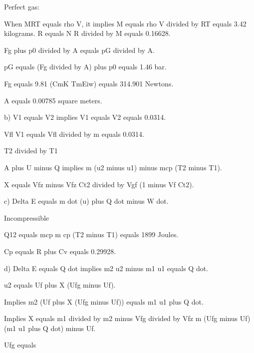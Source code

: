 Perfect gas:

When MRT equals rho V, it implies M equals rho V divided by RT equals 3.42 kilograms. R equals N R divided by M equals 0.16628.

Fg plus p0 divided by A equals pG divided by A.

pG equals (Fg divided by A) plus p0 equals 1.46 bar.

Fg equals 9.81 (CmK TmEiw) equals 314.901 Newtons.

A equals 0.00785 square meters.

b) V1 equals V2 implies V1 equals V2 equals 0.0314.

Vfl V1 equals Vfl divided by m equals 0.0314.

T2 divided by T1

A plus U minus Q implies m (u2 minus u1) minus mcp (T2 minus T1).

X equals Vfz minus Vfz Ct2 divided by Vgf (1 minus Vf Ct2).

c) Delta E equals m dot (u) plus Q dot minus W dot.

Incompressible

Q12 equals mcp m cp (T2 minus T1) equals 1899 Joules.

Cp equals R plus Cv equals 0.29928.

d) Delta E equals Q dot implies m2 u2 minus m1 u1 equals Q dot.

u2 equals Uf plus X (Ufg minus Uf).

Implies m2 (Uf plus X (Ufg minus Uf)) equals m1 u1 plus Q dot.

Implies X equals m1 divided by m2 minus Vfg divided by Vfz m (Ufg minus Uf) (m1 u1 plus Q dot) minus Uf.

Ufg equals